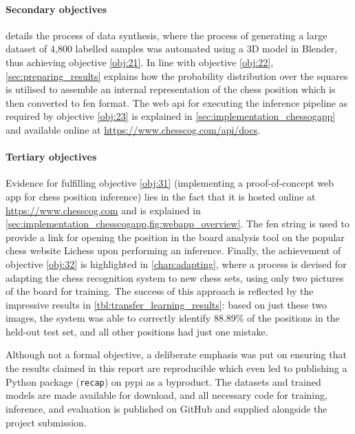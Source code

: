\documentclass[../main.tex]{subfiles}
\begin{document}
\paragraph{Secondary objectives}
 details the process of data synthesis, where the process of generating a large dataset of 4,800 labelled samples was automated using a 3D model in Blender, thus achieving objective \ref{obj:21}.
In line with objective \ref{obj:22}, \cref{sec:preparing_results} explains how the probability distribution over the squares is utilised to assemble an internal representation of the chess position which is then converted to \gls{fen} format.
The web \gls{api} for executing the inference pipeline as required by objective \ref{obj:23} is explained in \cref{sec:implementation_chessogapp} and available online at \url{https://www.chesscog.com/api/docs}.

\paragraph{Tertiary objectives}
Evidence for fulfilling objective \ref{obj:31} (implementing a proof-of-concept web app for chess position inference) lies in the fact that it is hosted online at \url{https://www.chesscog.com} and is explained in \cref{sec:implementation_chesscogapp,fig:webapp_overview}.
The \gls{fen} string is used to provide a link for opening the position in the board analysis tool on the popular chess website Lichess upon performing an inference.
Finally, the achievement of objective \ref{obj:32} is highlighted in \cref{chap:adapting}, where a process is devised for adapting the chess recognition system to new chess sets, using only two pictures of the board for training.
The success of this approach is reflected by the impressive results in \cref{tbl:transfer_learning_results}: based on just these two images, the system was able to correctly identify 88.89\% of the positions in the held-out test set, and all other positions had just one mistake.

Although not a formal objective, a deliberate emphasis was put on ensuring that the results claimed in this report are reproducible which even led to publishing a Python package (\texttt{recap}) on \gls{pypi} as a byproduct.
The datasets and trained models are made available for download, and all necessary code for training, inference, and evaluation is published on GitHub and supplied alongside the project submission.
\end{document}
